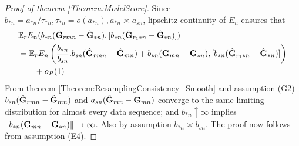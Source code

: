 \begin{proof}[Proof of theorem \ref{Theorem:ModelScore}]
Since $b_{* n} = a_{* n} / \tau_{* n}, \tau_{* n} = o(a_{* n}), a_{* n} \asymp a_{s n}$, lipschitz continuity of $E_n$ ensures that
%
\begin{align*}
& {\mathbb{E}}_r E_n ( b_{* n} ( \hat {{\mathbf{G}}}_{r m n} - \hat {{\mathbf{G}}}_{* n} ), [   b_{* n}  ( \hat {{\mathbf{G}}}_{r_1 * n} - \hat {{\mathbf{G}}}_{* n} ) ] ) \notag\\
& = {\mathbb{E}}_r E_n \left( \frac{ b_{* n} }{ b_{s n}} . b_{s n} ( \hat {{\mathbf{G}}}_{r m n} - \hat {{\mathbf{G}}}_{m n} ) + b_{* n} ( {\mathbf{G}}_{m n} - {\mathbf{G}}_{* n} ), [   b_{* n}  ( \hat {{\mathbf{G}}}_{r_1 * n} - \hat {{\mathbf{G}}}_{* n} ) ] \right) \notag\\
& \qquad + o_P(1)
\end{align*}
%
From theorem \ref{Theorem:ResamplingConsistency_Smooth} and assumption (G2) $b_{s n} ( \hat {{\mathbf{G}}}_{r m n} - \hat {{\mathbf{G}}}_{m n} )$ and $a_{s n} ( \hat {{\mathbf{G}}}_{m n} - {\mathbf{G}}_{m n} )$ converge to the same limiting distribution for almost every data sequence; and $b_{* n} \uparrow \infty$ implies $\| b_{* n} ( {\mathbf{G}}_{m n} - {\mathbf{G}}_{* n}) \| \rightarrow \infty$. Also by assumption $b_{* n} \asymp b_{s n}$. The proof now follows from assumption (E4).
\end{proof}

